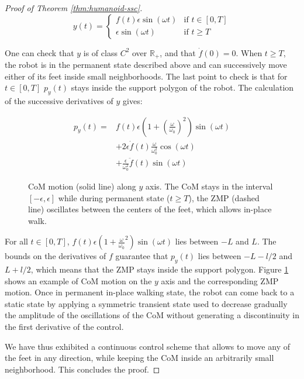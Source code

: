 \begin{proof}[Proof of Theorem \ref{thm:humanoid-ssc}]
\begin{equation}
y(t) = \left\{
\begin{array}{ll}
f(t)\epsilon\sin(\omega t) 
& \text{if } t\in [0,T]
\\ 
\epsilon\sin(\omega t) 
& \text{if } t \geq T \end{array}
\right.
\end{equation}

One can check that $y$ is of class $C^2$ over $\mathbb{R}_+$, and that
$\dot{f}(0) = 0$. When $t\geq T$, the robot is in the permanent state
described above and can successively move either of its feet inside
small neighborhoods.  The last point to check is that for $t \in
[0,T]$ $p_y(t)$ stays inside the support polygon of the robot. The
calculation of the successive derivatives of $y$ gives:

\begin{equation}
\begin{array}{cl}
p_y(t) = &  f(t) \epsilon (1 + \left(\frac{\omega}{\omega_0}\right)^2)
\sin (\omega  t) \\ &  + 2\epsilon \dot{f}(t)\frac{\omega}{\omega_0^2}
\cos  (\omega t)  \\ &  +  \frac{\epsilon}{\omega_0^2}\ddot{f}(t) \sin
(\omega t)
\end{array}
\end{equation}

\begin{figure}
\centering


\caption{CoM motion (solid line) along $y$ axis.  The CoM stays in the
  interval $[-\epsilon,\epsilon]$ while during permanent state ($t
  \geq T$), the ZMP (dashed line) oscillates between the centers of
  the feet, which allows in-place walk.}
\label{fig:zmp-inplace}
\end{figure}

For all $t \in [0,T]$, $f(t) \epsilon (1 + \frac{\omega}{\omega_0}^2)
\sin (\omega t)$ lies between $-L$ and $L$. The bounds on the
derivatives of $f$ guarantee that $p_y(t)$ lies between $-L- l/2$ and
$L+ l/2$, which means that the ZMP stays inside the support polygon.
Figure  \ref{fig:zmp-inplace} shows an example of CoM motion on the $y$
axis and the corresponding ZMP motion. Once in permanent in-place
walking state, the robot can come back to a static state by applying a
symmetric transient state used to decrease gradually the amplitude of
the oscillations of the CoM without generating a discontinuity in the
first derivative of the control.

We have thus exhibited a continuous control scheme that allows to move
any of the feet in any direction, while keeping the CoM inside an
arbitrarily small neighborhood. This concludes the proof.
\end{proof}

